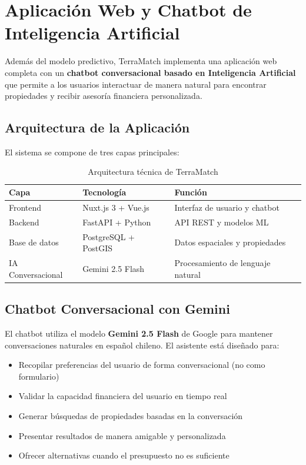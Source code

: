 \documentclass[11pt,letterpaper]{article}
\begin{document}
\newpage
\section{Aplicación Web y Chatbot de Inteligencia Artificial}

Además del modelo predictivo, TerraMatch implementa una aplicación web completa con un \textbf{chatbot conversacional basado en Inteligencia Artificial} que permite a los usuarios interactuar de manera natural para encontrar propiedades y recibir asesoría financiera personalizada.

\subsection{Arquitectura de la Aplicación}

El sistema se compone de tres capas principales:

\begin{table}[H]
\centering
\caption{Arquitectura técnica de TerraMatch}
\label{tab:arquitectura}
\begin{tabular}{@{}lll@{}}
\toprule
\textbf{Capa} & \textbf{Tecnología} & \textbf{Función} \\
\midrule
Frontend & Nuxt.js 3 + Vue.js & Interfaz de usuario y chatbot \\
Backend & FastAPI + Python & API REST y modelos ML \\
Base de datos & PostgreSQL + PostGIS & Datos espaciales y propiedades \\
IA Conversacional & Gemini 2.5 Flash & Procesamiento de lenguaje natural \\
\bottomrule
\end{tabular}
\end{table}

\subsection{Chatbot Conversacional con Gemini}

El chatbot utiliza el modelo \textbf{Gemini 2.5 Flash} de Google para mantener conversaciones naturales en español chileno. El asistente está diseñado para:

\begin{itemize}
    \item Recopilar preferencias del usuario de forma conversacional (no como formulario)
    \item Validar la capacidad financiera del usuario en tiempo real
    \item Generar búsquedas de propiedades basadas en la conversación
    \item Presentar resultados de manera amigable y personalizada
    \item Ofrecer alternativas cuando el presupuesto no es suficiente
\end{itemize}
\end{document}
